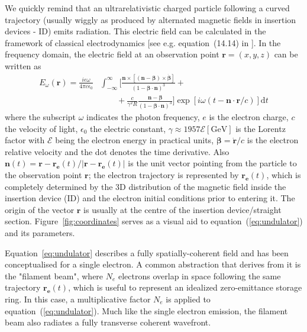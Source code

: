 \documentclass[preprint]{iucr}
\newcommand{\inred}[1]{{\color{red}#1}}
\begin{document}
We quickly remind that an ultrarelativistic charged particle following a curved trajectory (usually wiggly as produced by alternated magnetic fields in insertion devices - ID) emits radiation. This electric field can be calculated in the framework of classical electrodynamics [see e.g. equation~(14.14) in \cite{jackson}]. In the frequency domain\inred{,} the electric field at an observation point $\textbf{r}=(x,y,z)$ can be written as 
\begin{equation}
\begin{split}
    E_{\omega}(\textbf{r}) = \frac{i e \omega}{4 \pi c \epsilon_0} 
    &\int_{-\infty}^{\infty}
    \biggl[ 
    \frac{\textbf{n} \times [(\textbf{n} - \mathbf{\beta}) \times \dot{\mathbf{\beta}}]}
    {(1- \mathbf{\beta} \cdot \textbf{n})^3} +\\
    &\qquad+\frac{c}{\gamma^2 R}   \frac{\textbf{n} - \mathbf{\beta}}{(1-\mathbf{\beta} \cdot \textbf{n})^3} \biggr]
    \exp[i \omega (t - \textbf{n}\cdot\textbf{r}/c)] \mathrm{d}t
\end{split}\label{eq:undulator}
\end{equation}
where the subscript $\omega$ indicates the photon frequency, $e$ is the electron charge, $c$ the velocity of light, $\epsilon_0$ the electric constant, $\gamma \approx 1957\mathcal{E}[\mathrm{GeV}]$ is the Lorentz factor with $\mathcal{E}$ being the electron energy in practical units, $\mathbf{\beta}=\dot{\mathbf{r}}\big/c$ is the electron relative velocity and the dot denotes the time derivative.
Also $\textbf{n}(t)=\textbf{r}-\textbf{r}_{\textbf{e}}(t)\big/|\textbf{r}-\textbf{r}_{\textbf{e}}(t)|$ is the unit vector pointing from the particle to the observation point $\textbf{r}$; the electron trajectory is represented by $\textbf{r}_{\textbf{e}}(t)$, which is completely determined by the 3D distribution of the magnetic field inside the \inred{insertion device (}ID\inred{)} and the electron initial conditions prior to entering it. The origin of the vector $\textbf{r}$ is usually at the \inred{centre} of the insertion device/straight section. Figure~\ref{fig:coordinates} serves as a visual aid to equation~(\ref{eq:undulator}) and its parameters. 

Equation~\ref{eq:undulator} describes a fully spatially-coherent field and has been conceptualised for a single electron. A common abstraction that derives from it is the "filament beam", where $N_e$ electrons overlap in space following \inred{the} same trajectory $\textbf{r}_{\textbf{e}}(t)$, which is useful to  represent an idealized zero-emittance storage ring. In this case, a multiplicative factor $N_e$ is applied to equation~(\ref{eq:undulator}). Much like the single electron emission, the filament beam also radiates a fully transverse coherent wavefront.
\end{document}
